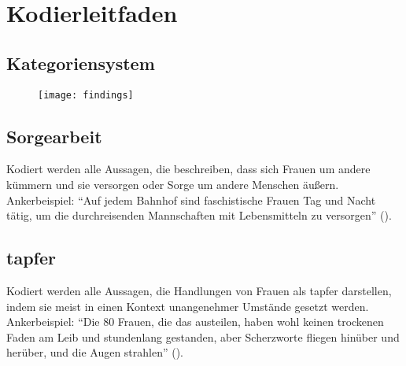 \documentclass[12pt, titlepage=true, toc=bib]{scrartcl}
\begin{document}
{\newpage

\nocite{medici_faschistische_1941}
\nocite{a._v._s._kameradschaft_1936}
\nocite{maltzahn_deutsche_1936}
\nocite{reimer_glucklich_1941}
\nocite{scholtz-klink_frauen_1936}
\nocite{weinhandl_wie_1941}
\nocite{friewart_japanisches_1941}


\printbibheading[title=Literaturverzeichnis]
\printbibliography[heading=subbibliography, keyword={Quelle}, title={Quellen}]
\printbibliography[heading=subbibliography, notkeyword={Quelle}]
\newpage

\appendix

\addpart{\appendixname}

\section{Kodierleitfaden}

\subsection*{Kategoriensystem}

\begin{figure}[htbp] %

\texttt{[image: findings]}
\end{figure}


\subsection*{Sorgearbeit}

Kodiert werden alle Aussagen, die beschreiben, dass sich Frauen um andere kümmern und sie versorgen oder Sorge um andere Menschen äußern.\\
Ankerbeispiel: "`Auf jedem Bahnhof sind faschistische Frauen Tag und Nacht tätig, um die durchreisenden Mannschaften mit Lebensmitteln zu versorgen"' (\cite[3]{medici_faschistische_1941}).

\subsection*{tapfer}

Kodiert werden alle Aussagen, die Handlungen von Frauen als tapfer darstellen, indem sie meist in einen Kontext unangenehmer Umstände gesetzt werden.\\
Ankerbeispiel: "`Die 80 Frauen, die das austeilen, haben wohl keinen trockenen Faden am Leib und stundenlang gestanden, aber Scherzworte fliegen hinüber und herüber, und die Augen strahlen"' (\cite[775]{a._v._s._kameradschaft_1936}).

}
\end{document}
